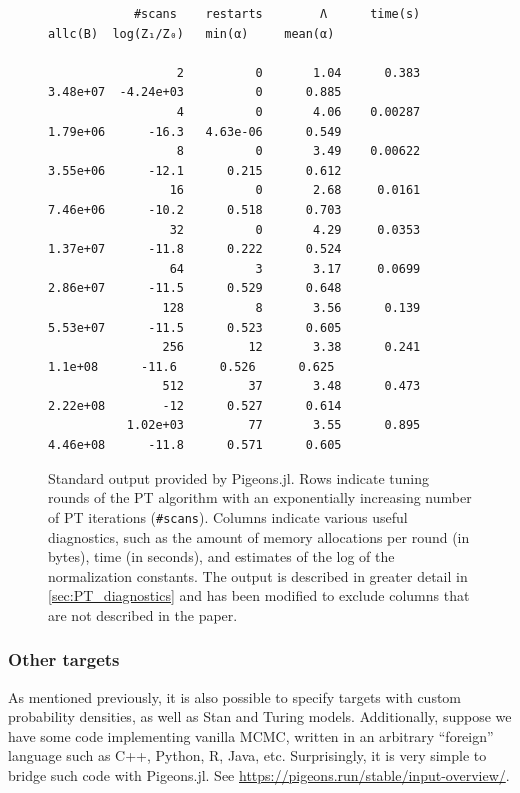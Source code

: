 \begin{figure}[t]
    \centering
    \begin{lstlisting}
            #scans    restarts        Λ      time(s)    allc(B)  log(Z₁/Z₀)   min(α)     mean(α)

                  2          0       1.04      0.383   3.48e+07  -4.24e+03          0      0.885
                  4          0       4.06    0.00287   1.79e+06      -16.3   4.63e-06      0.549
                  8          0       3.49    0.00622   3.55e+06      -12.1      0.215      0.612
                 16          0       2.68     0.0161   7.46e+06      -10.2      0.518      0.703
                 32          0       4.29     0.0353   1.37e+07      -11.8      0.222      0.524
                 64          3       3.17     0.0699   2.86e+07      -11.5      0.529      0.648
                128          8       3.56      0.139   5.53e+07      -11.5      0.523      0.605
                256         12       3.38      0.241    1.1e+08      -11.6      0.526      0.625
                512         37       3.48      0.473   2.22e+08        -12      0.527      0.614
           1.02e+03         77       3.55      0.895   4.46e+08      -11.8      0.571      0.605

    \end{lstlisting}
    \caption{Standard output provided by Pigeons.jl. 
    Rows indicate tuning rounds of the PT algorithm with an exponentially increasing number 
    of PT iterations (\texttt{\#scans}). Columns indicate various useful diagnostics, 
    such as the amount of memory allocations per round (in bytes), time (in seconds), and estimates 
    of the log of the normalization constants. 
    The output is described in greater detail in \cref{sec:PT_diagnostics}
    and has been modified to exclude columns that are not described in the paper.}
    \label{fig:standard_out}
\end{figure}


\subsubsection{Other targets}
As mentioned previously, it is also possible to specify targets with custom 
probability densities, as well as Stan and Turing models. 
Additionally, suppose we have some code implementing vanilla MCMC, written 
in an arbitrary ``foreign'' language such as C++, Python, R, Java, etc. 
Surprisingly, it is very simple to bridge such code with Pigeons.jl. 
See \url{https://pigeons.run/stable/input-overview/}.


